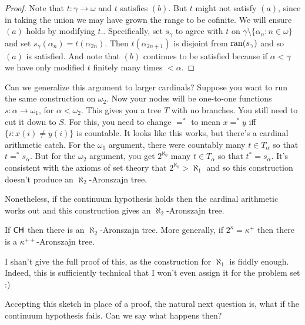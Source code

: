 \documentclass[10pt]{amsart}
\begin{document}
\begin{proof}
Note that $t : \gamma \to \omega$ and $t$ satisfies $(b)$. But $t$ might not satisfy $(a)$, since in taking the union we may have grown the range to be cofinite. We will ensure $(a)$ holds by modifying $t$..  Specifically, set $s_\gamma$ to agree with $t$ on $\gamma \setminus \{ \alpha_n : n \in \omega\}$ and set $s_\gamma(\alpha_n) = t(\alpha_{2n})$. Then $t(\alpha_{2n+1})$ is disjoint from $\operatorname{ran}(s_\gamma)$ and so $(a)$ is satisfied. And note that $(b)$ continues to be satisfied because if $\alpha < \gamma$ we have only modified $t$ finitely many times $< \alpha$.
\end{proof}


Can we generalize this argument to larger cardinals? Suppose you want to run the same construction on $\omega_2$. Now your nodes will be one-to-one functions $s : \alpha \to \omega_1$, for $\alpha < \omega_2$. This gives you a tree $T$ with no branches. You still need to cut it down to $S$. For this, you need to change $=^*$ to mean $x =^* y$ iff $\{ i : x(i) \ne y(i) \}$ is countable. It looks like this works, but there's a cardinal arithmetic catch. For the $\omega_1$ argument, there were countably many $t \in T_\alpha$ so that $t =^* s_\alpha$. But for the $\omega_2$ argument, you get $2^{\aleph_0}$ many $t \in T_\alpha$ so that $t^* = s_\alpha$. It's consistent with the axioms of set theory that $2^{\aleph_0} > \aleph_1$ and so this construction doesn't produce an $\aleph_2$-Aronszajn tree.

Nonetheless, if the continuum hypothesis holds then the cardinal arithmetic works out and this construction gives an $\aleph_2$-Aronszajn tree.

\begin{theorem}
If $\mathsf{CH}$ then there is an $\aleph_2$-Aronszajn tree. More generally, if $2^\kappa = \kappa^+$ then there is a $\kappa^{++}$-Aronszajn tree.
\end{theorem}

I shan't give the full proof of this, as the construction for $\aleph_1$ is fiddly enough. Indeed, this is sufficiently technical that I won't even assign it for the problem set :)

Accepting this sketch in place of a proof, the natural next question is, what if the continuum hypothesis fails. Can we say what happens then?
\end{document}
